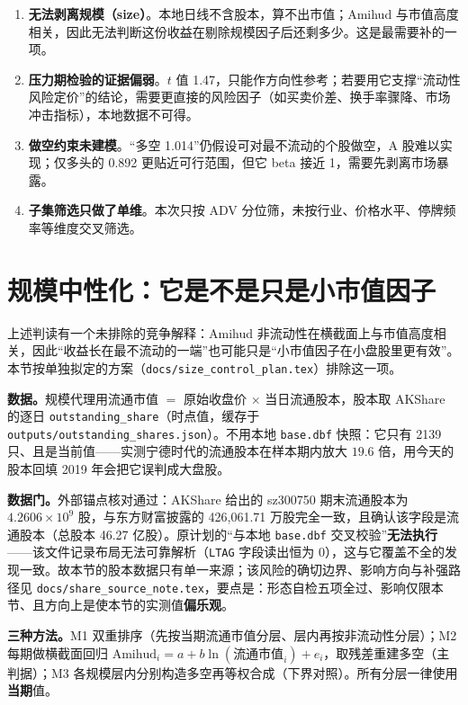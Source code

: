 \documentclass[11pt,a4paper]{ctexart}
\begin{document}
\begin{enumerate}
  \item \textbf{无法剥离规模（size）}。本地日线不含股本，算不出市值；Amihud 与市值高度相关，因此无法判断这份收益在剔除规模因子后还剩多少。这是最需要补的一项。
  \item \textbf{压力期检验的证据偏弱}。$t$ 值 1.47，只能作方向性参考；若要用它支撑“流动性风险定价”的结论，需要更直接的风险因子（如买卖价差、换手率骤降、市场冲击指标），本地数据不可得。
  \item \textbf{做空约束未建模}。“多空 1.014”仍假设可对最不流动的个股做空，A 股难以实现；仅多头的 0.892 更贴近可行范围，但它 beta 接近 1，需要先剥离市场暴露。
  \item \textbf{子集筛选只做了单维}。本次只按 ADV 分位筛，未按行业、价格水平、停牌频率等维度交叉筛选。
\end{enumerate}

\section{规模中性化：它是不是只是小市值因子}\label{sec:size}

上述判读有一个未排除的竞争解释：Amihud 非流动性在横截面上与市值高度相关，因此“收益长在最不流动的一端”也可能只是“小市值因子在小盘股里更有效”。本节按单独拟定的方案（\texttt{docs/size\_control\_plan.tex}）排除这一项。

\textbf{数据。}规模代理用流通市值 $=$ 原始收盘价 $\times$ 当日流通股本，股本取 AKShare 的逐日 \texttt{outstanding\_share}（时点值，缓存于 \texttt{outputs/outstanding\_shares.json}）。不用本地 \texttt{base.dbf} 快照：它只有 2139 只、且是当前值——实测宁德时代的流通股本在样本期内放大 $19.6$ 倍，用今天的股本回填 2019 年会把它误判成大盘股。

\textbf{数据门。}外部锚点核对通过：AKShare 给出的 sz300750 期末流通股本为 $4.2606\times10^9$ 股，与东方财富披露的 426{,}061.71 万股完全一致，且确认该字段是流通股本（总股本 46.27 亿股）。原计划的“与本地 \texttt{base.dbf} 交叉校验”\textbf{无法执行}——该文件记录布局无法可靠解析（\texttt{LTAG} 字段读出恒为 0），这与它覆盖不全的发现一致。故本节的股本数据只有单一来源；该风险的确切边界、影响方向与补强路径见 \texttt{docs/share\_source\_note.tex}，要点是：形态自检五项全过、影响仅限本节、且方向上是使本节的实测值\textbf{偏乐观}。

\textbf{三种方法。}M1 双重排序（先按当期流通市值分层、层内再按非流动性分层）；M2 每期做横截面回归 $\text{Amihud}_i = a + b\ln(\text{流通市值}_i) + e_i$，取残差重建多空（主判据）；M3 各规模层内分别构造多空再等权合成（下界对照）。所有分层一律使用\textbf{当期}值。
\end{document}

